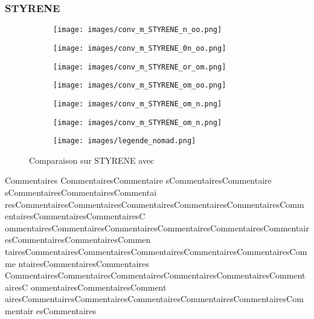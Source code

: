		\subsubsection{STYRENE}
			\begin{figure}[!htb] %
				\centering
				\begin{subfigure}{0.43\textwidth}
					\texttt{[image: images/conv\_m\_STYRENE\_n\_oo.png]}
				\end{subfigure}%
				\begin{subfigure}{0.43\textwidth}
					\texttt{[image: images/conv\_m\_STYRENE\_0n\_oo.png]}
				\end{subfigure}
				\smallskip
				\begin{subfigure}{0.43\textwidth}
					\texttt{[image: images/conv\_m\_STYRENE\_or\_om.png]}
				\end{subfigure}%
				\begin{subfigure}{0.43\textwidth}
					\texttt{[image: images/conv\_m\_STYRENE\_om\_oo.png]}
				\end{subfigure}
				\smallskip
				\begin{subfigure}{0.43\textwidth}
					\texttt{[image: images/conv\_m\_STYRENE\_om\_n.png]}
				\end{subfigure}%
				\begin{subfigure}{0.43\textwidth}
					\texttt{[image: images/conv\_m\_STYRENE\_om\_n.png]}
				\end{subfigure}
				\smallskip
				\begin{subfigure}{0.95\textwidth}
					\texttt{[image: images/legende\_nomad.png]}
				\end{subfigure}
				\caption{Comparaison sur STYRENE avec \MADS} \label{fig:3}
			\end{figure}
			\clearpage
			Commentaires CommentairesCommentaire sCommentairesCommentaire sCommentairesCommentairesCommentai resCommentairesCommentairesCommentairesCommentairesCommentairesComm entairesCommentairesCommentairesC ommentairesCommentairesCommentairesCommentairesCommentairesCommentair esCommentairesCommentairesCommen tairesCommentairesCommentairesCommentairesCommentairesCommentairesComme ntairesCommentairesCommentaires CommentairesCommentairesCommentairesCommentairesCommentairesCommentairesC ommentairesCommentairesComment airesCommentairesCommentairesCommentairesCommentairesCommentairesCommentair esCommentaires
			\clearpage
